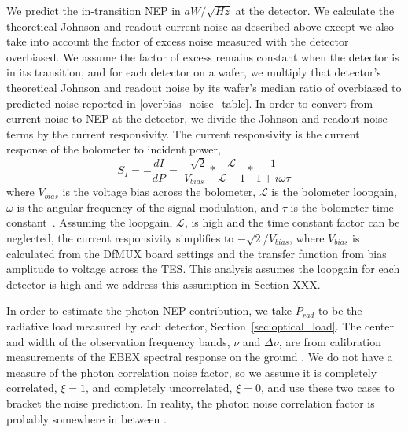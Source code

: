 \documentclass[../EBEXPaper2.tex]{subfiles}
\begin{document}
We predict the in-transition \ac{NEP} in $aW/\sqrt{Hz}$ at the detector. 
We calculate the theoretical Johnson and readout current noise as described above except we also take into account the factor of excess noise measured with the detector overbiased. 
We assume the factor of excess remains constant when the detector is in its transition, and for each detector on a wafer, we multiply that detector's theoretical Johnson and readout noise by its wafer's median ratio of overbiased to predicted noise reported in \TAB\ref{overbias_noise_table}. 
In order to convert from current noise to \ac{NEP} at the detector, we divide the Johnson and readout noise terms by the current responsivity. 
The current responsivity is the current response of the bolometer to incident power,
\begin{equation}
S_I = -\frac{dI}{dP} = \frac{-\sqrt{2}}{V_{bias}} * \frac{\mathcal{L}}{\mathcal{L} + 1} * \frac{1}{1 + i\omega\tau}
\label{eq:current_responsivity}
\end{equation}
where $V_{bias}$ is the voltage bias across the bolometer, $\mathcal{L}$ is the bolometer loopgain, $\omega$ is the angular frequency of the signal modulation, and $\tau$ is the bolometer time constant~\citep{aubin_thesis}. 
Assuming the loopgain, $\mathcal{L}$, is high and the time constant factor can be neglected, the current responsivity simplifies to $-\sqrt{2}/V_{bias}$, where $V_{bias}$ is calculated from the \ac{DfMUX} board settings and the transfer function from bias amplitude to voltage across the \ac{TES}. 
This analysis assumes the loopgain for each detector is high and we address this assumption in Section XXX. 

In order to estimate the photon \ac{NEP} contribution, we take $P_{rad}$ to be the radiative load measured by each detector, Section~\ref{sec:optical_load}. 
The center and width of the observation frequency bands, $\nu$ and $\Delta \nu$, are from calibration measurements of the \ac{EBEX} spectral response on the ground \citep{Zilic_thesis}. 
We do not have a measure of the photon correlation noise factor, so we assume it is completely correlated, $\xi=1$, and completely uncorrelated, $\xi=0$, and use these two cases to bracket the noise prediction. 
In reality, the photon noise correlation factor is probably somewhere in between \cite{}. 
\end{document}

